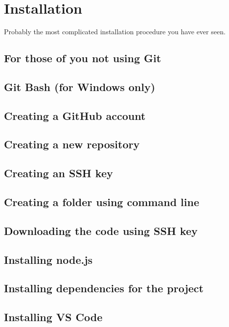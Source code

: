 \chapter{Installation}

Probably the most complicated installation procedure you have ever seen.

\section*{For those of you not using Git}

\section{Git Bash (for Windows only)}

\section{Creating a GitHub account}

\section{Creating a new repository}

\section{Creating an SSH key}

\section{Creating a folder using command line}

\section{Downloading the code using SSH key}

\section{Installing node.js}

\section{Installing dependencies for the project}

\section{Installing VS Code}